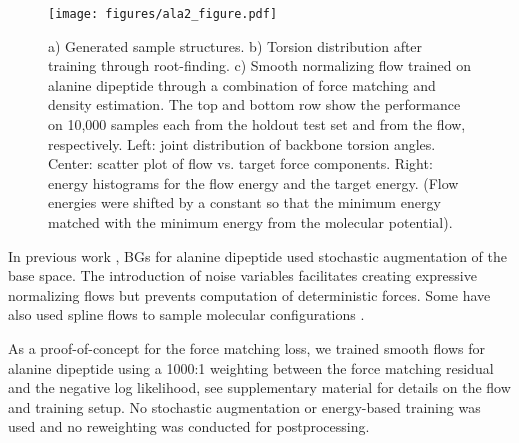 \documentclass{article}
\begin{document}
\label{sec:fm}
\begin{figure}[htbp]
    \centering
    \texttt{[image: figures/ala2\_figure.pdf]}
    \caption{a) Generated sample structures. b) Torsion distribution after training through root-finding. c) Smooth normalizing flow trained on alanine dipeptide through a combination of force matching and density estimation. The top and bottom row show the performance on 10,000 samples each from the holdout test set and from the flow, respectively. Left: joint distribution of backbone torsion angles. 
    Center: scatter plot of flow vs. target force components.
    Right: energy histograms for the flow energy and the target energy. (Flow energies were shifted by a constant so that the minimum energy matched with the minimum energy from the molecular potential). 
    }
    \label{fig:ala2_bg}
    \label{fig:ala2_samples}
    \label{fig:invbg}
\end{figure}
    

In previous work \cite{wu2020snf, dibak2020temperature, kramer2020training}, BGs for alanine dipeptide used stochastic augmentation of the base space. The introduction of noise variables facilitates creating expressive normalizing flows but prevents computation of deterministic forces. Some have also used spline flows to sample molecular configurations \cite{wirnsberger2020targeted, ding2021deepbar}.

As a proof-of-concept for the force matching loss, we trained smooth flows for alanine dipeptide using a 1000:1 weighting between the force matching residual and the negative log likelihood, 
see supplementary material
for details on the flow and training setup. No stochastic augmentation or energy-based training was used and no reweighting was conducted for postprocessing.
\end{document}
